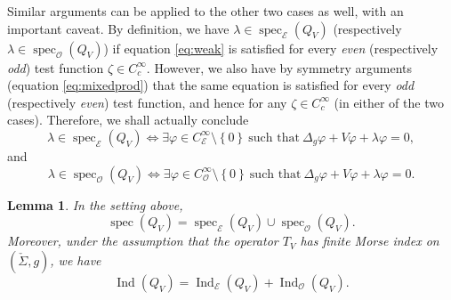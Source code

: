 \documentclass[JEP,XML,SOM,Unicode]{cedram}
\let\mathcal\mathscr
\newcounter{cas}
\DeclareMathOperator{\Ind}{Ind}
\DeclareMathOperator{\spec}{spec}
\newtheorem{lem}[thm]{Lemma}
\theoremstyle{definition}
\begin{document}
Similar arguments can be applied to the other two cases as well, with an important caveat. By definition, we have $\lambda\in \spec_{\mathcal{E}} (Q_V)$ (respectively $\lambda\in \spec_{\mathcal{O}} (Q_V)$) if equation \eqref{eq:weak} is satisfied for every \emph{even} (respectively \emph{odd}) test function $\zeta\in C^{\infty}_c$. However, we also have by symmetry arguments (\cf equation \eqref{eq:mixedprod}) that the same equation is satisfied for every \emph{odd} (respectively \emph{even}) test function, and hence for any $\zeta\in C^{\infty}_c$ (in either of the two cases). Therefore, we shall actually conclude
\[
\lambda\in \spec_{\mathcal{E}} (Q_V) \iff \exists \varphi\in C^{\infty}_{\mathcal{E}}\setminus \left\{0\right\} \ \text{such that} \ \Delta_g \varphi+V\varphi+\lambda\varphi=0,
\]
and
\[
\lambda\in \spec_{\mathcal{O}} (Q_V) \iff \exists \varphi\in C^{\infty}_{\mathcal{O}}\setminus \left\{0\right\} \ \text{such that} \ \Delta_g \varphi+V\varphi+\lambda\varphi=0.
\]

\begin{lem}\label{lem:specadd}
In the setting above,
\[
\spec(Q_V)=\spec_{\mathcal{E}} (Q_V) \cup \spec_{\mathcal{O}} (Q_V).
\]
Moreover, under the assumption that the operator $T_V$ has finite Morse index on $(\check{\Sigma},g)$, we have
\[
\Ind(Q_V) = \Ind_{\mathcal{E}} (Q_V)+\Ind_{\mathcal{O}} (Q_V).
\]
\end{lem}
\end{document}
